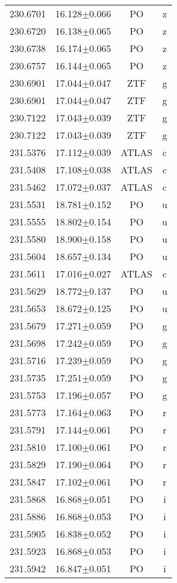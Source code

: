 \begin{table}
\begin{tabular}{cccc}
230.6701 & 16.128$\pm$0.066 & PO & z \\
230.6720 & 16.138$\pm$0.065 & PO & z \\
230.6738 & 16.174$\pm$0.065 & PO & z \\
230.6757 & 16.144$\pm$0.065 & PO & z \\
230.6901 & 17.044$\pm$0.047 & ZTF & g \\
230.6901 & 17.044$\pm$0.047 & ZTF & g \\
230.7122 & 17.043$\pm$0.039 & ZTF & g \\
230.7122 & 17.043$\pm$0.039 & ZTF & g \\
231.5376 & 17.112$\pm$0.039 & ATLAS & c \\
231.5408 & 17.108$\pm$0.038 & ATLAS & c \\
231.5462 & 17.072$\pm$0.037 & ATLAS & c \\
231.5531 & 18.781$\pm$0.152 & PO & u \\
231.5555 & 18.802$\pm$0.154 & PO & u \\
231.5580 & 18.900$\pm$0.158 & PO & u \\
231.5604 & 18.657$\pm$0.134 & PO & u \\
231.5611 & 17.016$\pm$0.027 & ATLAS & c \\
231.5629 & 18.772$\pm$0.137 & PO & u \\
231.5653 & 18.672$\pm$0.125 & PO & u \\
231.5679 & 17.271$\pm$0.059 & PO & g \\
231.5698 & 17.242$\pm$0.059 & PO & g \\
231.5716 & 17.239$\pm$0.059 & PO & g \\
231.5735 & 17.251$\pm$0.059 & PO & g \\
231.5753 & 17.196$\pm$0.057 & PO & g \\
231.5773 & 17.164$\pm$0.063 & PO & r \\
231.5791 & 17.144$\pm$0.061 & PO & r \\
231.5810 & 17.100$\pm$0.061 & PO & r \\
231.5829 & 17.190$\pm$0.064 & PO & r \\
231.5847 & 17.102$\pm$0.061 & PO & r \\
231.5868 & 16.868$\pm$0.051 & PO & i \\
231.5886 & 16.868$\pm$0.053 & PO & i \\
231.5905 & 16.838$\pm$0.052 & PO & i \\
231.5923 & 16.868$\pm$0.053 & PO & i \\
231.5942 & 16.847$\pm$0.051 & PO & i \\

\end{tabular}
\end{table}
